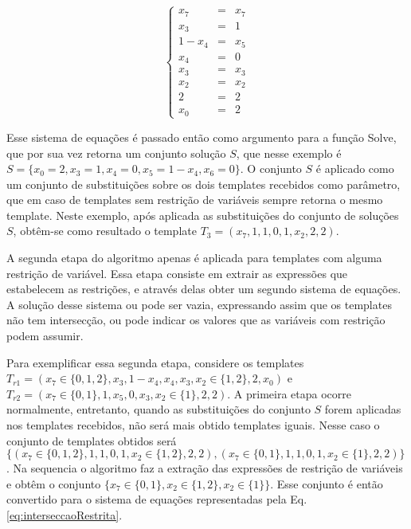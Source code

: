 \begin{equation}
\left\{\begin{matrix}
x_7   & = & x_7 \\ 
x_3   & = & 1 \\ 
1-x_4 & = & x_5    \\ 
x_4   & = & 0    \\ 
x_3   & = & x_3    \\ 
x_2   & = & x_2   \\ 
2     & = & 2   \\ 
x_0   & = & 2
\end{matrix}\right.
\label{eq:interseccao}
\end{equation}

Esse sistema de equações é passado então como argumento para a função Solve, que por sua vez retorna um conjunto solução $S$, que nesse exemplo é $S = \{x_0 = 2, x_3 = 1, x_4 = 0, x_5 = 1 - x_4, x_6 = 0\}$. O conjunto $S$ é aplicado como um conjunto de substituições sobre os dois templates recebidos como parâmetro, que em caso de templates sem restrição de variáveis sempre retorna o mesmo template. Neste exemplo, após aplicada as substituições do conjunto de soluções $S$, obtêm-se como resultado o template $T_3 = (x_7, 1, 1, 0, 1, x_2, 2, 2)$.

A segunda etapa do algoritmo apenas é aplicada para templates com alguma restrição de variável. Essa etapa consiste em extrair as expressões que estabelecem as restrições, e através delas obter um segundo sistema de equações. A solução desse sistema ou pode ser vazia, expressando assim que os templates não tem intersecção, ou pode indicar os valores que as variáveis com restrição podem assumir.

Para exemplificar essa segunda etapa, considere os templates $T_{r1} = (x_7 \in \{0,1,2\},x_3,1-x_4,x_4,x_3,x_2 \in \{1,2\},2,x_0)$ e $T_{r2} = (x_7 \in \{0,1\},1,x_5,0,x_3,x_2 \in \{1\},2,2)$. A primeira etapa ocorre normalmente, entretanto, quando as substituições do conjunto $S$ forem aplicadas nos templates recebidos, não será mais obtido templates iguais. Nesse caso o conjunto de templates obtidos será $\{(x_7 \in \{0,1,2\}, 1, 1, 0, 1, x_2 \in \{1,2\}, 2, 2), (x_7 \in \{0,1\}, 1, 1, 0, 1, x_2 \in \{1\}, 2, 2)\}$. Na sequencia o algoritmo faz a extração das expressões de restrição de variáveis e obtêm o conjunto $\{x_7 \in \{0,1\}, x_2 \in \{1,2\}, x_2 \in \{1\} \}$. Esse conjunto é então convertido para o sistema de equações representadas pela Eq. \eqref{eq:interseccaoRestrita}.

